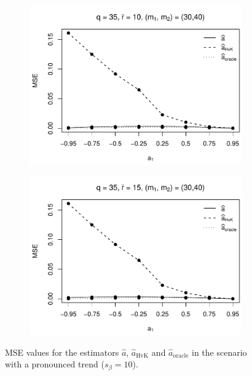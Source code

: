 \begin{figure}[p]
\begin{subfigure}[b]{0.45\textwidth}
\includegraphics[width=\textwidth]{Plots/Robustness/MSE_a1_T=500_slope=10_(q,r,M1,M2)=(35,10,30,40).pdf}
\end{subfigure}
\hspace{0.25cm}
\begin{subfigure}[b]{0.45\textwidth}
\includegraphics[width=\textwidth]{Plots/Robustness/MSE_a1_T=500_slope=10_(q,r,M1,M2)=(35,15,30,40).pdf}
\end{subfigure}
\caption{MSE values for the estimators $\widehat{a}$, $\widehat{a}_{\text{HvK}}$ and $\widehat{a}_{\text{oracle}}$ in the scenario with a pronounced trend ($s_\beta=10$).}\label{fig:MSE_slope10_AR_robust} 
\end{figure}


